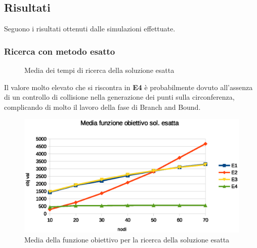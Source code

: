 \documentclass[12pt,a4paper]{article}
\begin{document}
        \subsection{Risultati}
            Seguono i risultati ottenuti dalle simulazioni effettuate.
            \subsubsection{Ricerca con metodo esatto}

                \begin{figure}
                    \centering
                    \caption{Media dei tempi di ricerca della soluzione esatta}
                \end{figure}

                Il valore molto elevato che si riscontra in \textbf{E4} \`e probabilmente dovuto all'assenza di un controllo di collisione
                nella generazione dei punti sulla circonferenza, complicando di molto il lavoro della fase di Branch and Bound.

                \begin{figure}
                    \centering
                    \includegraphics[scale=0.8]{img/exavgobj}
                    \caption{Media della funzione obiettivo per la ricerca della soluzione esatta}
                \end{figure}
\end{document}
